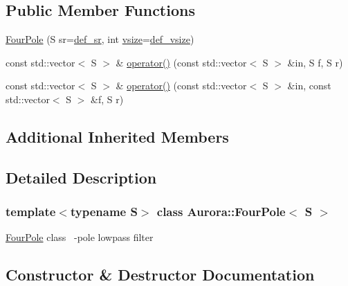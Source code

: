\subsection*{Public Member Functions}
\begin{DoxyCompactItemize}
\item 
\hyperlink{class_aurora_1_1_four_pole_acd6f1e5b94bdc248e8e955f4ef8f7dcc}{Four\+Pole} (S sr=\hyperlink{namespace_aurora_ad49263d809bea98dd422e95bc91bc03e}{def\+\_\+sr}, int \hyperlink{class_aurora_1_1_snd_base_ad68387541cc3d696d0cf58d474f94b73}{vsize}=\hyperlink{namespace_aurora_afaaddf667a06e7ce23c667a8b7295263}{def\+\_\+vsize})
\item 
const std\+::vector$<$ S $>$ \& \hyperlink{class_aurora_1_1_four_pole_ac3cfee8b5d8f0bf8d0b0c6784eb81fef}{operator()} (const std\+::vector$<$ S $>$ \&in, S f, S r)
\item 
const std\+::vector$<$ S $>$ \& \hyperlink{class_aurora_1_1_four_pole_a300ec87b54b5e8c5c76c1005fe31c9d9}{operator()} (const std\+::vector$<$ S $>$ \&in, const std\+::vector$<$ S $>$ \&f, S r)
\end{DoxyCompactItemize}
\subsection*{Additional Inherited Members}


\subsection{Detailed Description}
\subsubsection*{template$<$typename S$>$\newline
class Aurora\+::\+Four\+Pole$<$ S $>$}

\hyperlink{class_aurora_1_1_four_pole}{Four\+Pole} class ~-\/pole lowpass filter 

\subsection{Constructor \& Destructor Documentation}
\mbox{\label{class_aurora_1_1_four_pole_acd6f1e5b94bdc248e8e955f4ef8f7dcc}} 
